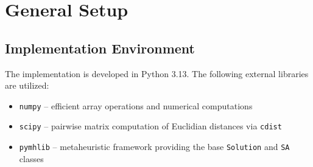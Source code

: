 \documentclass[a4paper]{scrartcl}
\begin{document}




\section{General Setup}
\subsection{Implementation Environment}
The implementation is developed in Python 3.13. The following external libraries are utilized:
\begin{itemize}
  \item \texttt{numpy} -- efficient array operations and numerical computations
  \item \texttt{scipy} -- pairwise matrix computation of Euclidian distances via \texttt{cdist}
  \item \texttt{pymhlib} -- metaheuristic framework providing the base \texttt{Solution} and \texttt{SA} classes
\end{itemize}
\end{document}

